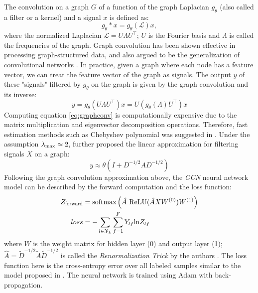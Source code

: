 \documentclass{article}
\theoremstyle{definition}
\begin{document}
The convolution on a graph $G$ of a function of the graph 
Laplacian $g_{\theta}$ (also called a filter or a kernel) 
and a signal $x$ is defined as:
$$g_{\theta} \ast x = g_{\theta}(\mathcal{L}) x,$$
where the normalized Laplacian $\mathcal{L} = U \Lambda U^\top$; 
$U$ is the Fourier basis and $\Lambda$ is called the frequencies of the graph. 
Graph convolution has been shown effective in processing
graph-structured data, and also argued to be the generalization
of convolutional networks
\cite{shuman2013emerging,defferrard2016convolutional,gcn}.
In practice, given a graph where each node has a feature vector,
we can treat the feature vector of the graph as signals. The output $y$
of these "signals" filtered by $g_\theta$ on the graph is given by
the graph convolution and its inverse: 
\begin{equation}
\label{eq:graphconv}
y = g_\theta (U \Lambda U^\top) x = U (g_\theta(\Lambda) U^\top)x
\end{equation}
Computing equation \ref{eq:graphconv} is computationally expensive
due to the matrix multiplication and eigenvector decomposition operations.
Therefore, fast estimation methods such as Chebyshev polynomial was suggested
in \cite{hammond2011wavelets}. Under the assumption
$\lambda_{\scalebox{0.75}{max}} \approx 2$, \citeauthor{gcn} further
proposed the linear approximation for filtering signals $X$ on a graph:
\begin{equation}
\label{eq:gcnapprox}
y \approx \theta \left( I + D^{-1/2}
A D^{-1/2} \right)
\end{equation}
Following the graph convolution approximation above, the \emph{GCN} neural network
model can be described by the forward computation and the loss function:
\begin{equation}
\label{eq:gcnnn}
\begin{aligned}
	Z_{\scalebox{0.75}{forward}} &=
\mbox{softmax}\left(\hat{A} \mbox{ ReLU}(\hat{A}XW^{(0)})W^{(1)}\right) \\
	loss &= -\sum_{l \in \mathcal{Y}_L} \sum^F_{f=1} Y_{lf}\mbox{ln} Z_{lf} \\
\end{aligned}
\end{equation}
where $W$ is the weight matrix for hidden layer (0) and output layer (1);
$\hat{A} = \tilde{D}^{-1/2} \tilde{A} \tilde{D}^{-1/2}$ is called the
\emph{Renormalization Trick} by the authors \cite{gcn}. The loss function here
is the cross-entropy error over all labeled samples similar to the model proposed
in \cite{planetoid}. The neural network is trained using Adam \cite{adam} with
back-propagation. 
\end{document}
